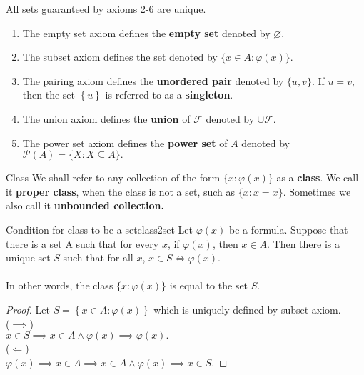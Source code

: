 \begin{remarks}
    All sets guaranteed by axioms 2-6 are unique.
    \begin{enumerate}
        \item The empty set axiom defines the \textbf{empty set} denoted by $\varnothing$.
        \item The subset axiom defines the set denoted by $\{x \in A:\varphi(x)\}$.
        \item The pairing axiom defines the \textbf{unordered pair} denoted by $\{u, v\}$.
        If $u = v$, then the set $\left\{u\right\}$ is referred to as a \textbf{singleton}.
        \item The union axiom defines the \textbf{union} of $\mathcal{F}$ denoted by $\cup \mathcal{F}$.
        \item The power set axiom defines the \textbf{power set} of $A$ denoted by $\mathcal{P}(A) = \{X:X \subseteq A\}.$
    \end{enumerate}
\end{remarks}

\begin{definition}{Class}{}
    We shall refer to any collection of the form $\{x:\varphi(x)\}$ as a \textbf{class}. We call it \textbf{proper class}, 
    when the class is not a set, such as $\{x:x=x\}$. Sometimes we also call it \textbf{unbounded collection.}
\end{definition}

\begin{theorem}{Condition for class to be a set}{class2set}
    Let $\varphi(x)$ be a formula. Suppose that there is a set A such that for every $x$, if $\varphi(x)$, then $x \in A$. Then there is a unique set $S$ such that for all $x$, $x \in S \iff \varphi(x)$.\\
    \\
    In other words, the class $\{x:\varphi(x)\}$ is equal to the set $S$.
\end{theorem}

\begin{proof}
    Let $S = \left\{x \in A \colon \varphi(x) \right\}$ which is uniquely defined by subset axiom.\\
    ($ \implies $)\\
    $x \in S \implies x \in A \land \varphi(x) \implies \varphi(x).$\\
    ($ \Leftarrow $)\\
    $\varphi(x) \implies x \in A \implies x \in A \land \varphi(x) \implies x \in S.$
\end{proof}

